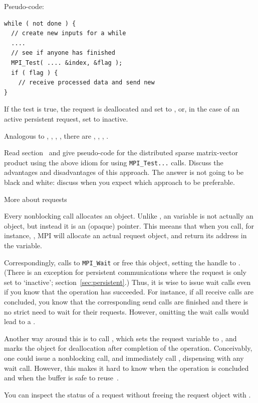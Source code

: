 Pseudo-code:
\begin{lstlisting}
while ( not done ) {
  // create new inputs for a while
  ....
  // see if anyone has finished
  MPI_Test( .... &index, &flag );
  if ( flag ) {
    // receive processed data and send new
}
\end{lstlisting}

If the test is true, the request is deallocated and set to ,
or, in the case of an active persistent request, set to inactive.

Analogous to , ,
, ,
there are
,
,
,
.

\begin{exercise}
  Read section~ and give pseudo-code for the
    distributed sparse matrix-vector product using the above idiom for
    using \lstinline{MPI_Test...} calls. Discuss the advantages and
    disadvantages of this approach. The answer is not going to be
    black and white: discuss when you expect which approach to be
    preferable.
\end{exercise}

 {More about requests}
\label{ref:mpirequest}

Every nonblocking call allocates an 
object.
Unlike ,
an  variable is not actually an object,
but instead it is an (opaque) pointer.
This meeans that when you call, for instance, ,
MPI will allocate an actual request object, and return its
address in the  variable.

Correspondingly, calls to \lstinline{MPI_Wait} or 
free this object,
setting the handle to .
(There is an exception for persistent communications where
the request is only set to `inactive'; section~\ref{sec:persistent}.)
Thus, it is wise to issue wait calls even
if you know that the operation has succeeded. For instance, if all
receive calls are concluded, you know that the corresponding send
calls are finished and there is no strict need to wait for their
requests. However, omitting the wait calls would lead to a
.

Another way around this is to call ,
which sets the request variable to ,
and marks the object for deallocation after completion of the
operation. Conceivably, one could issue a nonblocking call,
and immediately call , dispensing
with any wait call. However, this makes it hard to know when the operation
is concluded and when the buffer is safe to reuse~\cite{Squyres:evilrequest}.

You can inspect the status of a request without freeing the request object
with .



